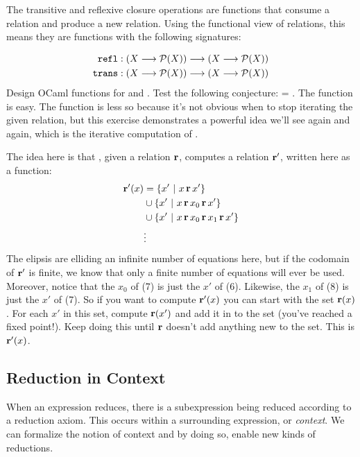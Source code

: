 \begin{exercise}
The transitive and reflexive closure operations are functions that
consume a relation and produce a new relation.  Using the functional
view of relations, this means they are functions with the following
signatures:

\begin{align*}
{\tt refl} : (X \longrightarrow \mathcal{P}(X)) \longrightarrow (X \longrightarrow \mathcal{P}(X))\\
{\tt trans} : (X \longrightarrow \mathcal{P}(X)) \longrightarrow (X \longrightarrow \mathcal{P}(X))\\
\end{align*}
%
Design OCaml functions for  and .  Test the
following conjecture:  = .  The  function is easy.  The
 function is less so because it's not obvious when to
stop iterating the given relation, but this exercise demonstrates a
powerful idea we'll see again and again, which is the iterative
computation of .

The idea here is that , given a relation $\mathop{\mathbf{r}}$,
computes a relation $\mathop{\mathbf{r}'}$, written here as a function:
\begin{align}
\mathop{\mathbf{r}'}(x) &= \{x'\ |\ x \mathop{\mathbf{r}} x'\} \\
&\cup \{x'\ |\ x \mathop{\mathbf{r}} x_0 \mathop{\mathbf{r}} x'\}\\
&\cup \{x'\ |\ x \mathop{\mathbf{r}} x_0 \mathop{\mathbf{r}} x_1 \mathop{\mathbf{r}} x'\}\\
&\vdots
\end{align}
%
The elipsis are elliding an infinite number of equations here, but if
the codomain of $\mathop{\mathbf{r}'}$ is finite, we know that only a finite number
of equations will ever be used.  Moreover, notice that the $x_0$ of
(7) is just the $x'$ of (6).  Likewise, the $x_1$ of (8) is just the
$x'$ of (7).  So if you want to compute $\mathop{\mathbf{r}'}(x)$ you can start with
the set $\mathop{\mathbf{r}}(x)$.  For each $x'$ in this set, compute $\mathop{\mathbf{r}}(x')$
and add it in to the set (you've reached a fixed point!).  Keep doing
this until $\mathop{\mathbf{r}}$ doesn't add anything new to the set.  This is
$\mathop{\mathbf{r}'}(x)$.
\end{exercise}


\subsection{Reduction in Context}
\label{sec:context}

When an expression reduces, there is a subexpression being reduced
according to a reduction axiom.  This occurs within a surrounding
expression, or \emph{context}.  We can formalize the notion of context
and by doing so, enable new kinds of reductions.


